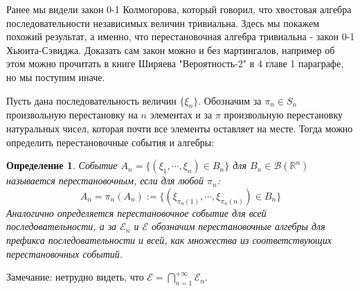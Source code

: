 \documentclass[12pt,a4paper]{article} %
\newtheorem{definition}{Определение}
\newcommand{\R}{\mathbb{R}}
\begin{document}
	Ранее мы видели закон 0-1 Колмогорова, который говорил, что хвостовая алгебра последовательности независимых величин тривиальна. Здесь мы покажем похожий результат, а именно, что перестановочная алгебра тривиальна - закон 0-1 Хьюита-Сэвиджа. Доказать сам закон можно и без мартингалов, например об этом можно прочитать в книге Ширяева "Вероятность-2" в 4 главе 1 параграфе, но мы поступим иначе.
	
	Пусть дана последовательность величин $\{\xi_n\}$. Обозначим за $\pi_n\in S_n$ произвольную перестановку на $n$ элементах и за $\pi$ произвольную перестановку натуральных чисел, которая почти все элементы оставляет на месте. Тогда можно определить перестановочные события и алгебры:
	\begin{definition}
		Событие $A_n=\{(\xi_1,\cdots,\xi_n)\in B_n\}$ для $B_n\in\mathcal{B}(\R^n)$ называется перестановочным, если для любой $\pi_n$:
		$$A_n=\pi_n(A_n):=\{(\xi_{\pi_n(1)},\cdots,\xi_{\pi_n(n)})\in B_n\}$$
		Аналогично определяется перестановочное событие для всей последовательности, а за $\mathcal{E}_n$ и $\mathcal{E}$ обозначим перестановочные алгебры для префикса последовательности и всей, как множества из соответствующих перестановочных событий.
	\end{definition}
	Замечание: нетрудно видеть, что $\mathcal{E}=\displaystyle\bigcap_{n=1}^{+\infty}\mathcal{E}_n$.
	
\end{document}
